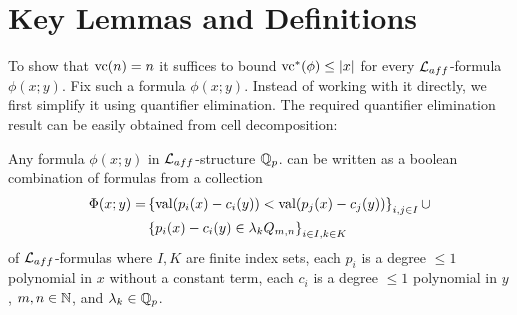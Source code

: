 
\section{Key Lemmas and Definitions}




To show that $\operatorname{vc}(n) = n$ it suffices to bound $\operatorname{vc}^*(\phi) \leq |x|$ for every $\mathcal L_{aff}$-formula $\phi(x; y)$.
Fix such a formula $\phi(x; y)$.
Instead of working with it directly, we first simplify it using quantifier elimination.
The required quantifier elimination result can be easily obtained from cell decomposition:
\begin{Lemma} \label {quantifier_elimination}
  Any formula $\phi(x; y)$ in $\mathcal L_{aff}$-structure $\mathbb{Q}_p$. can be written as a boolean combination of formulas from a collection
  \begin{align*}
    \Phi(x; y) = &\left\{\operatorname{val} (p_i(x) - c_i(y)) < \operatorname{val} (p_j(x) - c_j(y))\right\}_{i, j \in I} \cup \\
                 &\left\{p_i(x) - c_i(y) \in \lambda_k Q_{m,n}\right\}_{i \in I , k \in K}
  \end{align*}
  of $\mathcal L_{aff}$-formulas
  where $I, K$ are finite index sets,
  each $p_i$ is a degree $\leq 1$ polynomial in $x$ without a constant term,
  each $c_i$ is a degree $\leq 1$ polynomial in $y$,
  $m,n \in \mathbb{N}$,
  and
  $\lambda_k \in \mathbb{Q}_p$.
\end{Lemma}

